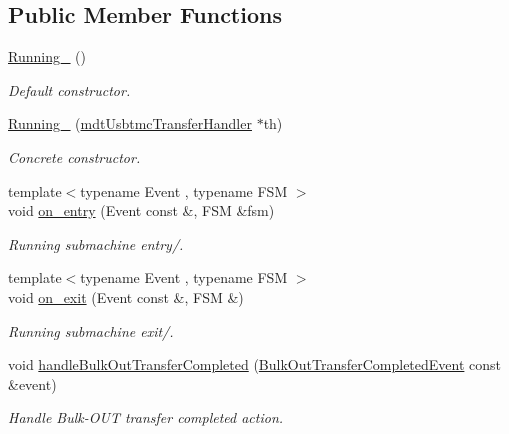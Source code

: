 \subsection*{Public Member Functions}
\begin{DoxyCompactItemize}
\item 
\hyperlink{structmdt_usbtmc_transfer_handler_state_machine_1_1_running___a2ea73aebf54ff32bf31fae260ddf94d8}{Running\-\_\-} ()
\begin{DoxyCompactList}\small\item\em Default constructor. \end{DoxyCompactList}\item 
\hyperlink{structmdt_usbtmc_transfer_handler_state_machine_1_1_running___abb3e68093807b1279c11519ef302f0ab}{Running\-\_\-} (\hyperlink{classmdt_usbtmc_transfer_handler}{mdt\-Usbtmc\-Transfer\-Handler} $\ast$th)
\begin{DoxyCompactList}\small\item\em Concrete constructor. \end{DoxyCompactList}\item 
{\footnotesize template$<$typename Event , typename F\-S\-M $>$ }\\void \hyperlink{structmdt_usbtmc_transfer_handler_state_machine_1_1_running___aa6ddcb0cc2777ae64973ce544752b2db}{on\-\_\-entry} (Event const \&, F\-S\-M \&fsm)
\begin{DoxyCompactList}\small\item\em Running submachine entry/. \end{DoxyCompactList}\item 
{\footnotesize template$<$typename Event , typename F\-S\-M $>$ }\\void \hyperlink{structmdt_usbtmc_transfer_handler_state_machine_1_1_running___a2594fbe72361fb9c3850e576b0631a9d}{on\-\_\-exit} (Event const \&, F\-S\-M \&)
\begin{DoxyCompactList}\small\item\em Running submachine exit/. \end{DoxyCompactList}\item 
void \hyperlink{structmdt_usbtmc_transfer_handler_state_machine_1_1_running___af6ee8aeff0026b5d6eccd931f76340db}{handle\-Bulk\-Out\-Transfer\-Completed} (\hyperlink{structmdt_usbtmc_transfer_handler_state_machine_1_1_bulk_out_transfer_completed_event}{Bulk\-Out\-Transfer\-Completed\-Event} const \&event)
\begin{DoxyCompactList}\small\item\em Handle Bulk-\/\-O\-U\-T transfer completed action. \end{DoxyCompactList}\item 

\end{DoxyCompactItemize}
